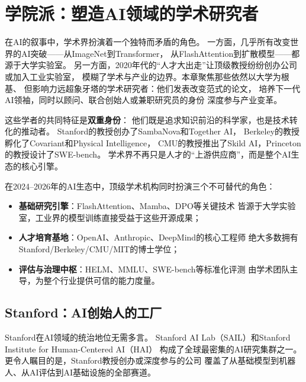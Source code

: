 
\chapter{学院派：塑造AI领域的学术研究者}
\label{ch:academics}

在AI的叙事中，学术界扮演着一个独特而矛盾的角色。
一方面，几乎所有改变世界的AI突破——从ImageNet到Transformer，
从FlashAttention到扩散模型——都源于大学实验室。
另一方面，2020年代的``人才大出走''让顶级教授纷纷创办公司或加入工业实验室，
模糊了学术与产业的边界。本章聚焦那些依然以大学为根基、
但影响力远超象牙塔的学术研究者：他们发表改变范式的论文，
培养下一代AI领袖，同时以顾问、联合创始人或兼职研究员的身份
深度参与产业变革。

这些学者的共同特征是\textbf{双重身份}：
他们既是追求知识前沿的科学家，也是技术转化的推动者。
Stanford的教授创办了SambaNova和Together AI，
Berkeley的教授孵化了Covariant和Physical Intelligence，
CMU的教授推出了Skild AI，Princeton的教授设计了SWE-bench。
学术界不再只是人才的``上游供应商''，而是整个AI生态的核心引擎。

\begin{corebox}[学术界的三重角色]
在2024--2026年的AI生态中，顶级学术机构同时扮演三个不可替代的角色：
\begin{itemize}
  \item \textbf{基础研究引擎}：FlashAttention、Mamba、DPO等关键技术
        皆源于大学实验室，工业界的模型训练直接受益于这些开源成果；
  \item \textbf{人才培育基地}：OpenAI、Anthropic、DeepMind的核心工程师
        绝大多数拥有Stanford/Berkeley/CMU/MIT的博士学位；
  \item \textbf{评估与治理中枢}：HELM、MMLU、SWE-bench等标准化评测
        由学术团队主导，为整个行业提供可信的能力度量。
\end{itemize}
\end{corebox}


\section{Stanford：AI创始人的工厂}
\label{sec:stanford}

Stanford在AI领域的统治地位无需多言。
Stanford AI Lab（SAIL）和Stanford Institute for Human-Centered AI（HAI）
构成了全球最密集的AI研究集群之一。
更令人瞩目的是，Stanford教授创办或深度参与的公司
覆盖了从基础模型到机器人、从AI评估到AI基础设施的全部赛道。

